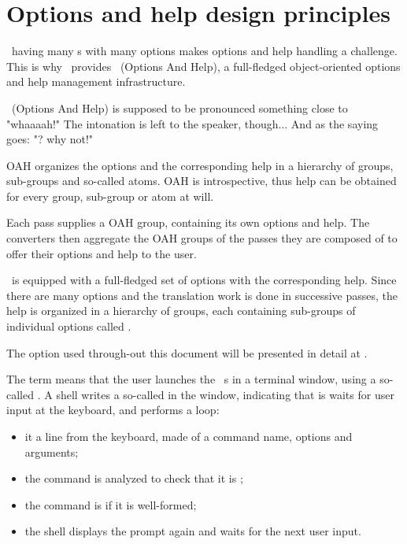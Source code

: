 
\chapter{Options and help design principles}

\mf\ having many \service s with many options makes options and help handling a challenge.\\
This is why \mf\ provides \oahRepr\ (Options And Help), a full-fledged object-oriented options and help management infrastructure.

\oahRepr\ (Options And Help) is supposed to be pronounced something close to "whaaaah!"
    The intonation is left to the speaker, though...
    And as the saying goes: "\oahRepr? why not!"

OAH organizes the options and the corresponding help in a hierarchy of groups, sub-groups and so-called atoms. OAH is introspective, thus help can be obtained for every group, sub-group or atom at will.

Each pass supplies a OAH group, containing its own options and help. The converters then aggregate the OAH groups of the passes they are composed of to offer their options and help to the user.

\mf\ is equipped with a full-fledged set of options with the corresponding help. Since there are many options and the translation work is done in successive passes, the help is organized in a hierarchy of groups, each containing sub-groups of individual options called .

The  option used through-out this document will be presented in detail at .


The term {\it \CLI} means that the user launches the \mf\ \service s in a terminal window, using a so-called . A shell writes a so-called  in the window, indicating that is waits for user input at the keyboard, and performs a loop:
\begin{itemize}
\item it  a line from the keyboard, made of a command name, options and arguments;
\item the command is analyzed to check that it is ;
\item the command is  if it is well-formed;
\item the shell displays the prompt again and waits for the next user input.
\end{itemize}

